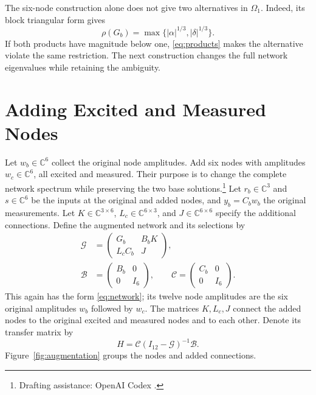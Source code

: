 \documentclass[letterpaper,10pt,conference]{ieeeconf}
\newcommand{\aicite}{\footnote{Drafting assistance: OpenAI Codex \cite{codex}.}\space}
\begin{document}
The six-node construction alone does not give two alternatives in
\(\Omega_1\). Indeed, its block triangular form gives
\[
 \rho(G_b)=\max\{|\alpha|^{1/3},|\delta|^{1/3}\}.
\]
If both products have magnitude below one, \eqref{eq:products} makes
the alternative violate the same restriction. The next construction
changes the full network eigenvalues while retaining the ambiguity.

\section{Adding Excited and Measured Nodes}
\label{sec:augmentation}

Let \(w_b\in\mathbb C^6\) collect the original node amplitudes.
Add six nodes with amplitudes \(w_c\in\mathbb C^6\), all excited and measured.
Their purpose is to change the complete network spectrum while
preserving the two base solutions.\aicite
Let \(r_b\in\mathbb C^3\) and \(s\in\mathbb C^6\) be the inputs
at the original and added nodes, and \(y_b=C_bw_b\) the original
measurements.
Let \(K\in\mathbb C^{3\times6}\), \(L_c\in\mathbb C^{6\times3}\), and
\(J\in\mathbb C^{6\times6}\) specify the additional connections.
Define the augmented network and its selections by
\begin{equation}\label{eq:augmentation}
\begin{split}
 \mathcal G&=\begin{pmatrix}G_b&B_bK\\L_cC_b&J\end{pmatrix},\\
 \mathcal B&=\begin{pmatrix}B_b&0\\0&I_6\end{pmatrix},\qquad
 \mathcal C=\begin{pmatrix}C_b&0\\0&I_6\end{pmatrix}.
\end{split}
\end{equation}
This again has the form \eqref{eq:network}; its twelve node amplitudes
are the six original amplitudes \(w_b\) followed by \(w_c\).
The matrices \(K,L_c,J\) connect the added nodes to the original
excited and measured nodes and to each other.
Denote its transfer matrix by
\begin{equation}\label{eq:H}
 H=\mathcal C(I_{12}-\mathcal G)^{-1}\mathcal B.
\end{equation}
Figure~\ref{fig:augmentation} groups the nodes and added connections.
\end{document}

